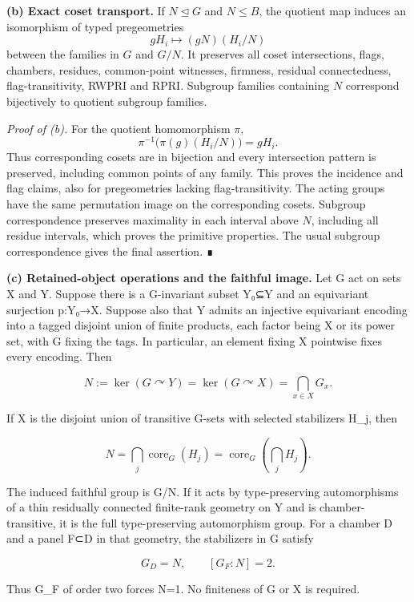 \documentclass[
  10pt,
  letterpaper,
]{article}
\begin{document}
\textbf{(b) Exact coset transport.} If \(N\unlhd G\) and \(N\leq B\),
the quotient map induces an isomorphism of typed pregeometries \[
 gH_i\longmapsto (gN)(H_i/N)
\tag{A6.3}
\] between the families in \(G\) and \(G/N\). It preserves all coset
intersections, flags, chambers, residues, common-point witnesses,
firmness, residual connectedness, flag-transitivity, RWPRI and RPRI.
Subgroup families containing \(N\) correspond bijectively to quotient
subgroup families.

\emph{Proof of (b).} For the quotient homomorphism \(\pi\), \[
\pi^{-1}\bigl(\pi(g)(H_i/N)\bigr)=gH_i.
\] Thus corresponding cosets are in bijection and every intersection
pattern is preserved, including common points of any family. This proves
the incidence and flag claims, also for pregeometries lacking
flag-transitivity. The acting groups have the same permutation image on
the corresponding cosets. Subgroup correspondence preserves maximality
in each interval above \(N\), including all residue intervals, which
proves the primitive properties. The usual subgroup correspondence gives
the final assertion. ∎

\textbf{(c) Retained-object operations and the faithful image.} Let G
act on sets X and Y. Suppose there is a G-invariant subset Y₀⊆Y and an
equivariant surjection p:Y₀→X. Suppose also that Y admits an injective
equivariant encoding into a tagged disjoint union of finite products,
each factor being X or its power set, with G fixing the tags. In
particular, an element fixing X pointwise fixes every encoding. Then

\[
 N:=\ker(G\curvearrowright Y)=\ker(G\curvearrowright X)
   =\bigcap_{x\in X}G_x.
 \tag{Kc1}
\]

If X is the disjoint union of transitive G-sets with selected
stabilizers H\_j, then

\[
 N=\bigcap_j\operatorname{core}_G(H_j)
   =\operatorname{core}_G\!\left(\bigcap_jH_j\right).
 \tag{Kc2}
\]

The induced faithful group is G/N. If it acts by type-preserving
automorphisms of a thin residually connected finite-rank geometry on Y
and is chamber-transitive, it is the full type-preserving automorphism
group. For a chamber D and a panel F⊂D in that geometry, the stabilizers
in G satisfy

\[
 G_D=N,\qquad [G_F:N]=2.
 \tag{Kc3}
\]

Thus G\_F of order two forces N=1. No finiteness of G or X is required.
\end{document}
